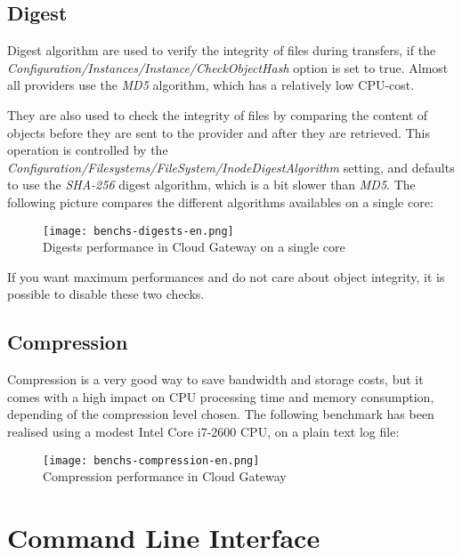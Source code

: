 \documentclass[11pt,fleqn,openany]{book} %
\begin{document}
\section{Digest}
\label{sec:performance-digest}

Digest algorithm are used to verify the integrity of files during transfers, if the \textit{Configuration/Instances/Instance/CheckObjectHash}
option is set to true. Almost all providers use the \textit{MD5} algorithm, which has a relatively low CPU-cost.

They are also used to check the integrity of files by comparing the content of objects before they are sent to the provider and after they are retrieved.
This operation is controlled by the \textit{Configuration/Filesystems/FileSystem/InodeDigestAlgorithm} setting, and defaults to use the \textit{SHA-256} digest
algorithm, which is a bit slower than \textit{MD5}. The following picture compares the different algorithms availables on a single core:

\begin{figure}[H]
\centering
\texttt{[image: benchs-digests-en.png]}\\
Digests performance in Cloud Gateway on a single core
\end{figure}

If you want maximum performances and do not care about object integrity, it is possible to disable these two checks.

\section{Compression}
\label{sec:performance-compression}

Compression is a very good way to save bandwidth and storage costs, but it comes with a high impact on CPU processing time
and memory consumption, depending of the compression level chosen. The following benchmark has been realised using a modest Intel Core i7-2600 CPU, on a plain text log file:

\begin{figure}[H]
\centering
\texttt{[image: benchs-compression-en.png]}\\
Compression performance in Cloud Gateway
\end{figure}

\cleardoublepage %
\chapter{Command Line Interface}
\label{chap:commnad-line-interface}
\end{document}
